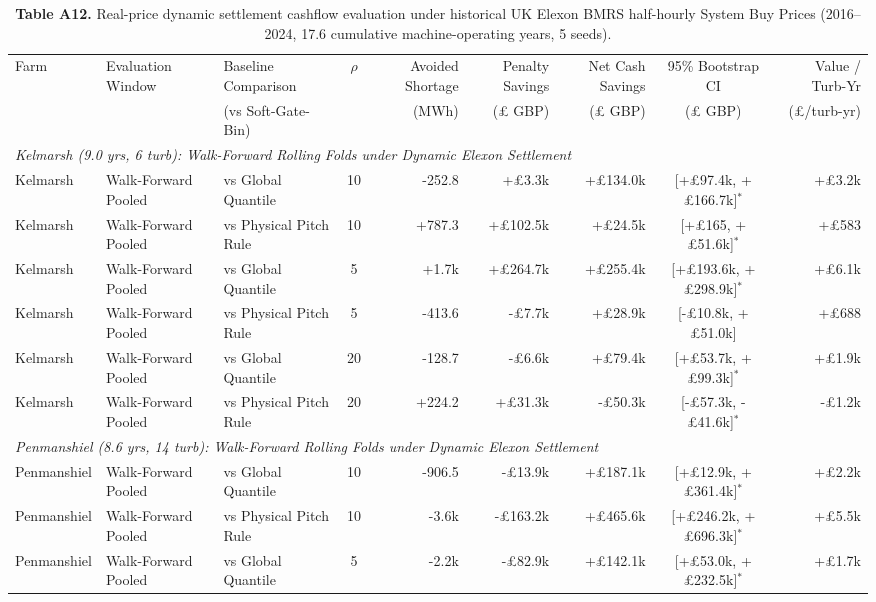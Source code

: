 \begin{table}[t]
\centering
\scriptsize
\setlength{\tabcolsep}{3.5pt}
\renewcommand{\arraystretch}{1.08}
\caption*{\textbf{Table A12.} Real-price dynamic settlement cashflow evaluation under historical UK Elexon BMRS half-hourly System Buy Prices (2016--2024, 17.6 cumulative machine-operating years, 5 seeds).}
\begin{tabular*}{\textwidth}{@{\extracolsep{\fill}}lllcrrrcr@{}}
\toprule
Farm & Evaluation Window & Baseline Comparison & $\rho$ & Avoided Shortage & Penalty Savings & Net Cash Savings & 95\% Bootstrap CI & Value / Turb-Yr \\
 & & (vs Soft-Gate-Bin) & & (MWh) & (£ GBP) & (£ GBP) & (£ GBP) & (£/turb-yr) \\
\midrule
\multicolumn{9}{l}{\textit{Kelmarsh (9.0 yrs, 6 turb): Walk-Forward Rolling Folds under Dynamic Elexon Settlement}} \\
Kelmarsh & Walk-Forward Pooled & vs Global Quantile & 10 & -252.8 & +£3.3k & +£134.0k & [+£97.4k, +£166.7k]$^*$ & +£3.2k \\
Kelmarsh & Walk-Forward Pooled & vs Physical Pitch Rule & 10 & +787.3 & +£102.5k & +£24.5k & [+£165, +£51.6k]$^*$ & +£583 \\
Kelmarsh & Walk-Forward Pooled & vs Global Quantile & 5 & +1.7k & +£264.7k & +£255.4k & [+£193.6k, +£298.9k]$^*$ & +£6.1k \\
Kelmarsh & Walk-Forward Pooled & vs Physical Pitch Rule & 5 & -413.6 & -£7.7k & +£28.9k & [-£10.8k, +£51.0k] & +£688 \\
Kelmarsh & Walk-Forward Pooled & vs Global Quantile & 20 & -128.7 & -£6.6k & +£79.4k & [+£53.7k, +£99.3k]$^*$ & +£1.9k \\
Kelmarsh & Walk-Forward Pooled & vs Physical Pitch Rule & 20 & +224.2 & +£31.3k & -£50.3k & [-£57.3k, -£41.6k]$^*$ & -£1.2k \\
\midrule
\multicolumn{9}{l}{\textit{Penmanshiel (8.6 yrs, 14 turb): Walk-Forward Rolling Folds under Dynamic Elexon Settlement}} \\
Penmanshiel & Walk-Forward Pooled & vs Global Quantile & 10 & -906.5 & -£13.9k & +£187.1k & [+£12.9k, +£361.4k]$^*$ & +£2.2k \\
Penmanshiel & Walk-Forward Pooled & vs Physical Pitch Rule & 10 & -3.6k & -£163.2k & +£465.6k & [+£246.2k, +£696.3k]$^*$ & +£5.5k \\
Penmanshiel & Walk-Forward Pooled & vs Global Quantile & 5 & -2.2k & -£82.9k & +£142.1k & [+£53.0k, +£232.5k]$^*$ & +£1.7k \\

\end{tabular*}
\end{table}
